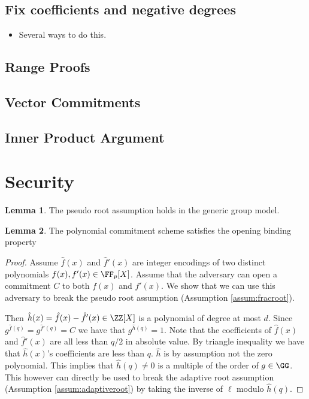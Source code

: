 \documentclass{article}
\theoremstyle{definition}
\newtheorem{lemma}{Lemma}
\begin{document}
\subsection{Fix coefficients and negative degrees}
\begin{itemize}
	\item Several ways to do this.
\end{itemize}

\subsection{Range Proofs}

\subsection{Vector Commitments}

\subsection{Inner Product Argument}

\section{Security}

\begin{lemma}
	The pseudo root assumption holds in the generic group model.
\end{lemma}
\begin{lemma}
	The polynomial commitment scheme satisfies the opening binding property
\end{lemma}
\begin{proof}
	Assume $\hat{f}(x)$ and $\hat{f}'(x)$ are integer encodings of two distinct polynomials $f(x),f'(x) \in \FF_p[X]$. Assume that the adversary can open a commitment $C$ to both $f(x)$ and $f'(x)$. We show that we can use this adversary to break the pseudo root assumption (Assumption \ref{assum:fracroot}).
	
	 Then $\hat{h}(x)=\hat{f}(x)-\hat{f}'(x) \in \ZZ[X]$ is a polynomial of degree at most $d$. Since $g^{\hat{f}(q)}=g^{\hat{f}'(q)}=C$ we have that $g^{\hat{h}(q)}=1$. Note that the coefficients of $\hat{f}(x)$ and $\hat{f}'(x)$ are all less than $q/2$ in absolute value. By triangle inequality we have that $\hat{h}(x)$'s coefficients are less than $q$. $\hat{h}$ is by assumption not the zero polynomial. This implies that $\hat{h}(q)\neq 0$ is a multiple of the order of $g\in \GG$. This however can directly be used to break the adaptive root assumption (Assumption \ref{assum:adaptiveroot}) by taking the inverse of $\ell$ modulo $\hat{h}(q)$.
\end{proof}
\end{document}
